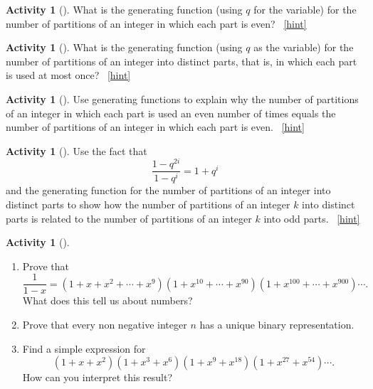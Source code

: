 \documentclass[10pt,]{book}
\theoremstyle{plain}
\theoremstyle{definition}
\theoremstyle{definition}
\theoremstyle{definition}
\newtheorem{activity}[project]{Activity}
\numberwithin{equation}{chapter}
\begin{document}
\begin{activity}[]\label{activity-314}
\hypertarget{p-1598}{}%
What is the generating function (using \(q\) for the variable) for the number of partitions of an integer in which each part is even?%
~\hfill{\tiny\hyperlink{a-321}{[hint]}\hypertarget{q-321}{}}\end{activity}
\begin{activity}[]\label{activity-315}
\hypertarget{p-1601}{}%
What is the generating function (using \(q\) as the variable) for the number of partitions of an integer into distinct parts, that is, in which each part is used at most once?%
~\hfill{\tiny\hyperlink{a-322}{[hint]}\hypertarget{q-322}{}}\end{activity}
\begin{activity}[]\label{activity-316}
\hypertarget{p-1604}{}%
Use generating functions to explain why the number of partitions of an integer in which each part is used an even number of times equals the number of partitions of an integer in which each part is even.%
~\hfill{\tiny\hyperlink{a-323}{[hint]}\hypertarget{q-323}{}}\end{activity}
\begin{activity}[]\label{activity-317}
\hypertarget{p-1607}{}%
Use the fact that%
\begin{equation*}
\frac{1-q^{2i}}{1-q^i}= 1+q^i
\end{equation*}
and the generating function for the number of partitions of an integer into distinct parts to show how the number of partitions of an integer \(k\) into distinct parts is related to the number of partitions of an integer \(k\) into odd parts.%
~\hfill{\tiny\hyperlink{a-324}{[hint]}\hypertarget{q-324}{}}\end{activity}
\begin{activity}[]\label{activity-318}
\leavevmode%
\begin{enumerate}[font=\bfseries,label=(\alph*),ref=\alph*]
\item\label{task-278} \hypertarget{p-1610}{}%
Prove that%
\begin{equation*}
\frac{1}{1-x} = (1 + x + x^2 +\cdots + x^9)(1 + x^{10} + \cdots + x^{90})(1 + x^{100} + \cdots + x^{900})\cdots.
\end{equation*}
What does this tell us about numbers?%
\item\label{task-279} \hypertarget{p-1611}{}%
Prove that every non negative integer \(n\) has a unique binary representation.%
\item\label{task-280} \hypertarget{p-1612}{}%
Find a simple expression for%
\begin{equation*}
(1+x+x^2)(1+x^3+x^6)(1+x^9+x^{18})(1+x^{27}+x^{54})\cdots.
\end{equation*}
How can you interpret this result?%
\end{enumerate}
\end{activity}
\end{document}
